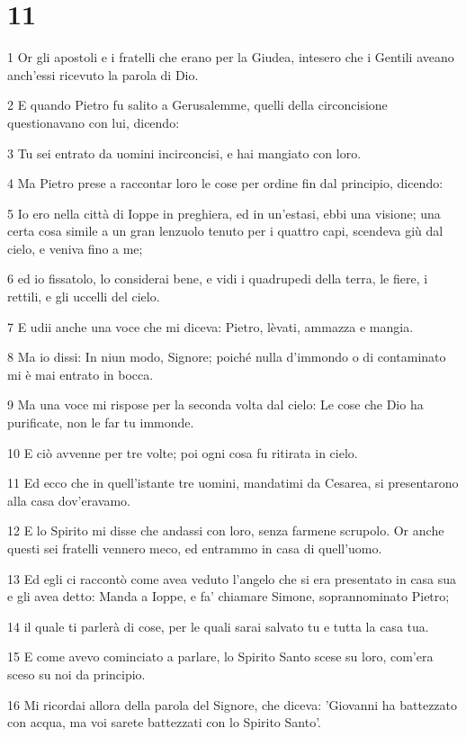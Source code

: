 \chapter{11}

\par 1 Or gli apostoli e i fratelli che erano per la Giudea, intesero che i Gentili aveano anch'essi ricevuto la parola di Dio.
\par 2 E quando Pietro fu salito a Gerusalemme, quelli della circoncisione questionavano con lui, dicendo:
\par 3 Tu sei entrato da uomini incirconcisi, e hai mangiato con loro.
\par 4 Ma Pietro prese a raccontar loro le cose per ordine fin dal principio, dicendo:
\par 5 Io ero nella città di Ioppe in preghiera, ed in un'estasi, ebbi una visione; una certa cosa simile a un gran lenzuolo tenuto per i quattro capi, scendeva giù dal cielo, e veniva fino a me;
\par 6 ed io fissatolo, lo considerai bene, e vidi i quadrupedi della terra, le fiere, i rettili, e gli uccelli del cielo.
\par 7 E udii anche una voce che mi diceva: Pietro, lèvati, ammazza e mangia.
\par 8 Ma io dissi: In niun modo, Signore; poiché nulla d'immondo o di contaminato mi è mai entrato in bocca.
\par 9 Ma una voce mi rispose per la seconda volta dal cielo: Le cose che Dio ha purificate, non le far tu immonde.
\par 10 E ciò avvenne per tre volte; poi ogni cosa fu ritirata in cielo.
\par 11 Ed ecco che in quell'istante tre uomini, mandatimi da Cesarea, si presentarono alla casa dov'eravamo.
\par 12 E lo Spirito mi disse che andassi con loro, senza farmene scrupolo. Or anche questi sei fratelli vennero meco, ed entrammo in casa di quell'uomo.
\par 13 Ed egli ci raccontò come avea veduto l'angelo che si era presentato in casa sua e gli avea detto: Manda a Ioppe, e fa' chiamare Simone, soprannominato Pietro;
\par 14 il quale ti parlerà di cose, per le quali sarai salvato tu e tutta la casa tua.
\par 15 E come avevo cominciato a parlare, lo Spirito Santo scese su loro, com'era sceso su noi da principio.
\par 16 Mi ricordai allora della parola del Signore, che diceva: 'Giovanni ha battezzato con acqua, ma voi sarete battezzati con lo Spirito Santo'.
